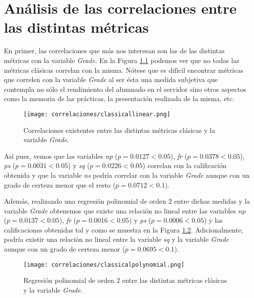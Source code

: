 \chapter{Análisis de las correlaciones entre las distintas métricas}\label{chapter:correlations}

En primer, las correlaciones que más nos interesan son las de las distintas métricas con la variable \emph{Grade}. En la Figura \ref{fig:correlations} podemos ver que no todas las métricas clásicas correlan con la misma. Nótese que es difícil encontrar métricas que correlen con la variable \emph{Grade} al ser ésta una medida subjetiva que contempla no sólo el rendimiento del alumnado en el servidor sino otros aspectos como la memoria de las prácticas, la presentación realizada de la misma, etc.

\begin{figure}[H]
    \centering
    \texttt{[image: correlaciones/classicallinear.png]}
    \caption{Correlaciones existentes entre las distintas métricas clásicas y la variable \emph{Grade}.}
    \label{fig:correlations}
\end{figure}

Así pues, vemos que las variables \emph{np} ($p = 0.0127 < 0.05$), \emph{fr} ($p = 0.0378 < 0.05$), \emph{ps} ($p = 0.0031 < 0.05$) y \emph{sq} ($p = 0.0226 < 0.05$) correlan con la calificación obtenida y que la variable \emph{ns} podría correlar con la variable \emph{Grade} aunque con un grado de certeza menor que el resto ($p = 0.0712 < 0.1$).

Además, realizando una regresión polinomial de orden $2$ entre dichas medidas y la variable \emph{Grade} obtenemos que existe una relación no lineal entre las variables \emph{np} ($p = 0.0137 < 0.05$), \emph{fr} ($p = 0.0016 < 0.05$) y \emph{ps} ($p = 0.0006 < 0.05$) y las calificaciones obtenidas tal y como se muestra en la Figura \ref{fig:correlations2}. Adicionalmente, podría existir una relación no lineal entre la variable \emph{sq} y la variable \emph{Grade} aunque con un grado de certeza menor ($p = 0.0695 < 0.1$).

\begin{figure}[H]
    \centering
    \texttt{[image: correlaciones/classicalpolynomial.png]}
    \caption{Regresión polinomial de orden $2$ entre las distintas métricas clásicas y la variable \emph{Grade}.}
    \label{fig:correlations2}
\end{figure}

